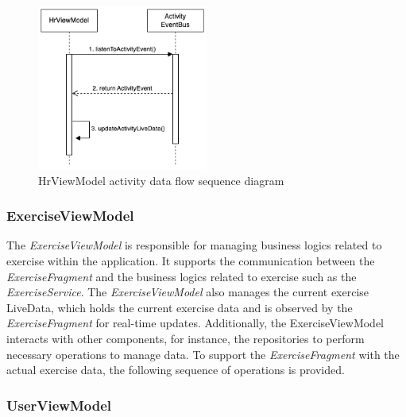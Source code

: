 \begin{figure}[H]
    \centering
    \includegraphics[width=0.5\textwidth]{diagrams/hrviewmodel-activity.drawio.png}
    \caption{HrViewModel activity data flow sequence diagram}
    \label{fig:hrviewmodel_activitydata}
\end{figure}

\subsubsection{ExerciseViewModel}
The \emph{ExerciseViewModel} is responsible for managing business logics related to exercise within the application.
It supports the communication between the \emph{ExerciseFragment} and the business logics related to exercise such as the \emph{ExerciseService}.
The \emph{ExerciseViewModel} also manages the current exercise LiveData, which holds the current exercise data and is observed by the \emph{ExerciseFragment} for real-time updates. 
Additionally, the ExerciseViewModel interacts with other components, for instance, the repositories to perform necessary operations to manage data.
To support the \emph{ExerciseFragment} with the actual exercise data, the following sequence of operations is provided.

\subsubsection{UserViewModel}
